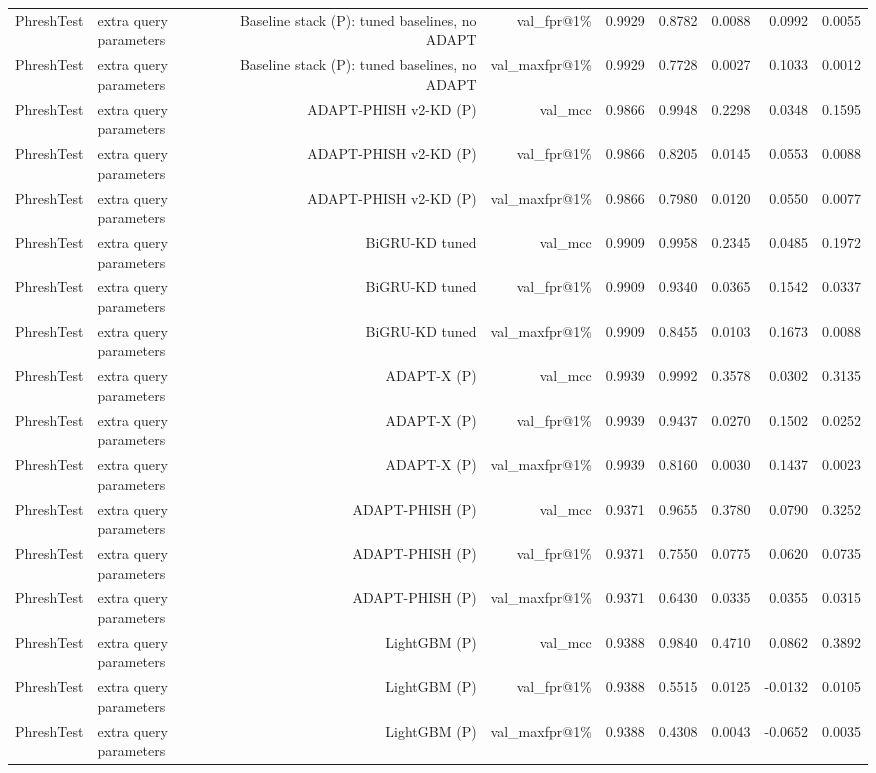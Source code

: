\begin{table}[t]
\begin{tabular}{llrrrrrrr}
PhreshTest & extra query parameters & Baseline stack (P): tuned baselines, no ADAPT & val\_fpr@1\% & 0.9929 & 0.8782 & 0.0088 & 0.0992 & 0.0055 \\
PhreshTest & extra query parameters & Baseline stack (P): tuned baselines, no ADAPT & val\_maxfpr@1\% & 0.9929 & 0.7728 & 0.0027 & 0.1033 & 0.0012 \\
PhreshTest & extra query parameters & ADAPT-PHISH v2-KD (P) & val\_mcc & 0.9866 & 0.9948 & 0.2298 & 0.0348 & 0.1595 \\
PhreshTest & extra query parameters & ADAPT-PHISH v2-KD (P) & val\_fpr@1\% & 0.9866 & 0.8205 & 0.0145 & 0.0553 & 0.0088 \\
PhreshTest & extra query parameters & ADAPT-PHISH v2-KD (P) & val\_maxfpr@1\% & 0.9866 & 0.7980 & 0.0120 & 0.0550 & 0.0077 \\
PhreshTest & extra query parameters & BiGRU-KD tuned & val\_mcc & 0.9909 & 0.9958 & 0.2345 & 0.0485 & 0.1972 \\
PhreshTest & extra query parameters & BiGRU-KD tuned & val\_fpr@1\% & 0.9909 & 0.9340 & 0.0365 & 0.1542 & 0.0337 \\
PhreshTest & extra query parameters & BiGRU-KD tuned & val\_maxfpr@1\% & 0.9909 & 0.8455 & 0.0103 & 0.1673 & 0.0088 \\
PhreshTest & extra query parameters & ADAPT-X (P) & val\_mcc & 0.9939 & 0.9992 & 0.3578 & 0.0302 & 0.3135 \\
PhreshTest & extra query parameters & ADAPT-X (P) & val\_fpr@1\% & 0.9939 & 0.9437 & 0.0270 & 0.1502 & 0.0252 \\
PhreshTest & extra query parameters & ADAPT-X (P) & val\_maxfpr@1\% & 0.9939 & 0.8160 & 0.0030 & 0.1437 & 0.0023 \\
PhreshTest & extra query parameters & ADAPT-PHISH (P) & val\_mcc & 0.9371 & 0.9655 & 0.3780 & 0.0790 & 0.3252 \\
PhreshTest & extra query parameters & ADAPT-PHISH (P) & val\_fpr@1\% & 0.9371 & 0.7550 & 0.0775 & 0.0620 & 0.0735 \\
PhreshTest & extra query parameters & ADAPT-PHISH (P) & val\_maxfpr@1\% & 0.9371 & 0.6430 & 0.0335 & 0.0355 & 0.0315 \\
PhreshTest & extra query parameters & LightGBM (P) & val\_mcc & 0.9388 & 0.9840 & 0.4710 & 0.0862 & 0.3892 \\
PhreshTest & extra query parameters & LightGBM (P) & val\_fpr@1\% & 0.9388 & 0.5515 & 0.0125 & -0.0132 & 0.0105 \\
PhreshTest & extra query parameters & LightGBM (P) & val\_maxfpr@1\% & 0.9388 & 0.4308 & 0.0043 & -0.0652 & 0.0035 \\

\end{tabular}
\end{table}
